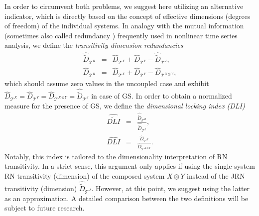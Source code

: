 \documentclass[graybox]{svmult}
\begin{document}
In order to circumvent both problems, we suggest here utilizing an alternative indicator, which is directly based on the concept of effective dimensions (degrees of freedom) of the individual systems. In analogy with the mutual information (sometimes also called redundancy \cite{Palus1995,Prichard1995}) frequently used in nonlinear time series analysis, we define the \emph{transitivity dimension redundancies}
\begin{eqnarray}
\hat{\tilde{D}}_{\mathcal{T}^R}&=&\hat{D}_{\mathcal{T}^X}+\hat{D}_{\mathcal{T}^Y}-\hat{\tilde{D}}_{\mathcal{T}^J}, \\
\hat{D}_{\mathcal{T}^R}&=&\hat{D}_{\mathcal{T}^X}+\hat{D}_{\mathcal{T}^Y}-\hat{D}_{\mathcal{T}^{X\otimes Y}},
\end{eqnarray}
\noindent
which should assume zero values in the uncoupled case and exhibit $\hat{D}_{\mathcal{T}^X}=\hat{D}_{\mathcal{T}^Y}=\hat{D}_{\mathcal{T}^{X\otimes Y}}=\hat{\tilde{D}}_{\mathcal{T}^J}$ in case of GS. In order to obtain a normalized measure for the presence of GS, we define the \emph{dimensional locking index (DLI)}
\begin{eqnarray}
\widehat{\widetilde{DLI}} &=& \frac{\hat{\tilde{D}}_{\mathcal{T}^R}}{\hat{\tilde{D}}_{\mathcal{T}^J}}, \\
\widehat{DLI} &=& \frac{\hat{D}_{\mathcal{T}^R}}{\hat{D}_{\mathcal{T}^{X\otimes Y}}}.
\end{eqnarray}
\noindent
Notably, this index is tailored to the dimensionality interpretation of RN transitivity. In a strict sense, this argument only applies if using the single-system RN transitivity (dimension) of the composed system $X\otimes Y$ instead of the JRN transitivity (dimension) $\hat{\tilde{D}}_{\mathcal{T}^J}$. However, at this point, we suggest using the latter as an approximation. A detailed comparison between the two definitions will be subject to future research.
\end{document}
